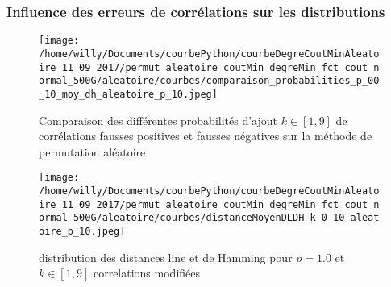 \subsubsection{Influence des erreurs de corr\'elations sur les distributions}
\begin{centering} 
\begin{figure}[htb!] 
\texttt{[image: /home/willy/Documents/courbePython/courbeDegreCoutMinAleatoire\_11\_09\_2017/permut\_aleatoire\_coutMin\_degreMin\_fct\_cout\_normal\_500G/aleatoire/courbes/comparaison\_probabilities\_p\_00\_10\_moy\_dh\_aleatoire\_p\_10.jpeg]}
\caption{ Comparaison des diff\'erentes probabilit\'es d'ajout $k \in [1,9]$ de corr\'elations fausses positives et fausses n\'egatives sur la m\'ethode de permutation al\'eatoire }
\label{compareDifferentesProbabilitesP0_1_fct_cout_unitaire_p05} 
\end{figure}
\end{centering} 

\begin{centering} 
\begin{figure}[htb!] 
\texttt{[image: /home/willy/Documents/courbePython/courbeDegreCoutMinAleatoire\_11\_09\_2017/permut\_aleatoire\_coutMin\_degreMin\_fct\_cout\_normal\_500G/aleatoire/courbes/distanceMoyenDLDH\_k\_0\_10\_aleatoire\_p\_10.jpeg]}
\caption{ distribution des distances line et de Hamming pour $p=1.0$ et $k \in [1,9]$ correlations modifi\'ees}
\label{distributionDLDH_p1.0_k19_fct_cout_unitaire} 
\end{figure}
\end{centering} 


